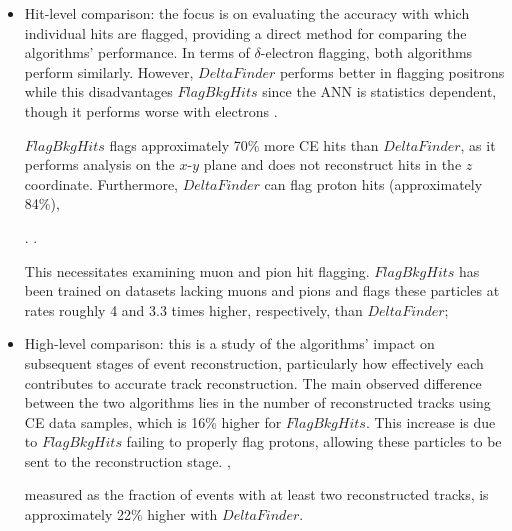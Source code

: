\begin{itemize}
    \item Hit-level comparison: the focus is on evaluating the 
    accuracy with which individual hits are flagged, providing a 
    direct method for comparing the algorithms' performance. In terms 
    of $\delta$-electron flagging, both algorithms perform similarly. 
    However, $DeltaFinder$ performs better in flagging positrons 
    while this disadvantages $FlagBkgHits$ since the ANN is 
    statistics dependent, though it 
    performs worse with electrons .

    $FlagBkgHits$ flags approximately 70\% more CE hits than 
    $DeltaFinder$, as it performs analysis on the $x$-$y$ plane and does 
    not reconstruct hits in the $z$ coordinate. Furthermore, 
    $DeltaFinder$ can flag proton hits (approximately 84\%), 


    . .

    This necessitates 
    examining muon and pion hit flagging. $FlagBkgHits$ has been trained 
    on datasets lacking muons and pions and  
    flags these particles at rates roughly 4 and 3.3 times higher, 
    respectively, than $DeltaFinder$;
    
    \item High-level comparison: this is a study of the algorithms' 
    impact on subsequent stages of event reconstruction, particularly 
    how effectively each contributes to accurate track reconstruction. 
    The main observed difference between the two algorithms lies in the number 
    of reconstructed tracks using CE data samples, which is 16\% higher 
    for $FlagBkgHits$. This increase is due to $FlagBkgHits$ failing to 
    properly flag protons, allowing these particles to be sent to the 
    reconstruction stage. ,


    measured as the fraction of events with 
    at least two reconstructed tracks, is approximately 22\% higher with $DeltaFinder$.
\end{itemize}



